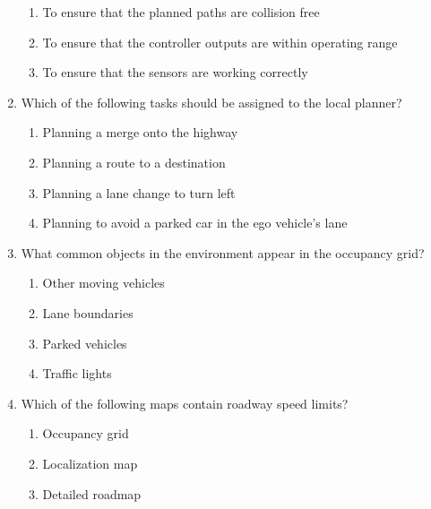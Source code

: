 \begin{enumerate}
\begin{enumerate}
		\item To ensure that the planned paths are collision free
		\item To ensure that the controller outputs are within operating range
		\item To ensure that the sensors are working correctly
	\end{enumerate}
\item Which of the following tasks should be assigned to the local planner?
	\begin{enumerate}
		\item Planning a merge onto the highway
		\item Planning a route to a destination
		\item Planning a lane change to turn left
		\item Planning to avoid a parked car in the ego vehicle's lane 
	\end{enumerate}
\item What common objects in the environment appear in the occupancy grid?
	\begin{enumerate}
		\item Other moving vehicles
		\item Lane boundaries
		\item Parked vehicles
		\item Traffic lights
	\end{enumerate}
\item Which of the following maps contain roadway speed limits?
	\begin{enumerate}
		\item Occupancy grid
		\item Localization map
		\item Detailed roadmap
	\end{enumerate}
\end{enumerate}


